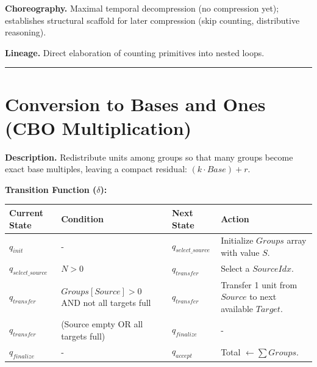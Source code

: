 \documentclass[12pt]{book}
\begin{document}
\textbf{Choreography.} Maximal temporal decompression (no compression
yet); establishes structural scaffold for later compression (skip
counting, distributive reasoning).

\textbf{Lineage.} Direct elaboration of counting primitives into nested
loops.

\begin{center}\rule{0.5\linewidth}{0.5pt}\end{center}

\section{Conversion to Bases and Ones (CBO
Multiplication)}\label{conversion-to-bases-and-ones-cbo-multiplication}

\textbf{Description.} Redistribute units among groups so that many
groups become exact base multiples, leaving a compact residual:
\((k \cdot Base) + r\).

\textbf{Transition Function (\(\delta\)):}

\begin{longtable}[]{@{}
  >{\raggedright\arraybackslash}p{}
  >{\raggedright\arraybackslash}p{}
  >{\raggedright\arraybackslash}p{}
  >{\raggedright\arraybackslash}p{}@{}}
\toprule\noalign{}
\begin{minipage}[b]{\linewidth}\raggedright
Current State
\end{minipage} & \begin{minipage}[b]{\linewidth}\raggedright
Condition
\end{minipage} & \begin{minipage}[b]{\linewidth}\raggedright
Next State
\end{minipage} & \begin{minipage}[b]{\linewidth}\raggedright
Action
\end{minipage} \\
\midrule\noalign{}
\endhead
\bottomrule\noalign{}
\endlastfoot
\(q_{init}\) & - & \(q_{select\_source}\) & Initialize \(Groups\) array
with value \(S\). \\
\(q_{select\_source}\) & \(N>0\) & \(q_{transfer}\) & Select a
\(SourceIdx\). \\
\(q_{transfer}\) & \(Groups[Source] > 0\) AND not all targets full &
\(q_{transfer}\) & Transfer 1 unit from \(Source\) to next available
\(Target\). \\
\(q_{transfer}\) & (Source empty OR all targets full) & \(q_{finalize}\)
& - \\
\(q_{finalize}\) & - & \(q_{accept}\) & Total
\(\leftarrow \sum Groups\). \\
\end{longtable}
\end{document}
